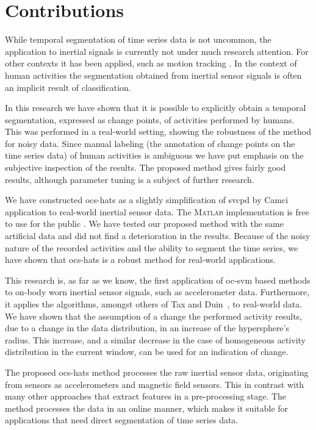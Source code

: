\section{Contributions}\label{sec:main_findings}
While temporal segmentation of time series data is not uncommon, the application to inertial signals is currently not under much research attention.
For other contexts it has been applied, such as motion tracking \cite{barbivc2004segmenting,li2007segmentation}.
In the context of human activities the segmentation obtained from inertial sensor signals is often an implicit result of classification.

In this research we have shown that it is possible to explicitly obtain a temporal segmentation, expressed as change points, of activities performed by humans.
This was performed in a real-world setting, showing the robustness of the method for noisy data.
Since manual labeling (the annotation of change points on the time series data) of human activities is ambiguous we have put emphasis on the subjective inspection of the results.
The proposed method gives fairly good results, although parameter tuning is a subject of further research.

We have constructed \gls{ocs-hats} as a slightly simplification of \gls{svcpd} by Camci~\cite{camci2010change} application to real-world inertial sensor data.
The \textsc{Matlab} implementation is free to use for the public \cite{vlasveld2014hats}.
We have tested our proposed method with the same artificial data and did not find a deterioration in the results.
Because of the noisy nature of the recorded activities and the ability to segment the time series, we have shown that \gls{ocs-hats} is a robust method for real-world applications.

This research is, as far as we know, the first application of \gls{oc-svm} based methods to on-body worn inertial sensor signals, such as accelerometer data.
Furthermore, it applies the algorithms, amongst others of Tax and Duin~\cite{tax1999support}, to real-world data.
We have shown that the assumption of a change the performed activity results, due to a change in the data distribution, in an increase of the hypersphere's radius.
This increase, and a similar decrease in the case of homogeneous activity distribution in the current window, can be used for an indication of change.

The proposed \gls{ocs-hats} method processes the raw inertial sensor data, originating from sensors as accelerometers and magnetic field sensors.
This in contrast with many other approaches that extract features in a pre-processing stage.
The method processes the data in an online manner, which makes it suitable for applications that need direct segmentation of time series data.

